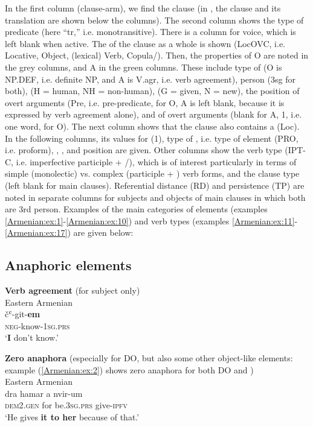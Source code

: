 \documentclass[output=paper,colorlinks,citecolor=brown,draftmode]{langscibook}
\begin{document}
In the first column (clause-arm), we find the clause (in , the clause and its translation are shown below the columns). The second column shows the type of predicate (here ``tr,'' i.e. monotransitive). There is a column for voice, which is left blank when active. The  of the clause as a whole is shown (LocOVC, i.e. Locative, Object, (lexical) Verb, Copula/). Then, the properties of O are noted in the grey columns, and A in the green columns. These include type of  (O is NP.DEF, i.e. definite NP, and A is V.agr, i.e. verb agreement), person (3sg for both),  (H = human, NH = non-human),  (G = given, N = new), the position of overt arguments (Pre, i.e. pre-predicate, for O, A is left blank, because it is expressed by verb agreement alone), and  of overt arguments (blank for A, 1, i.e. one word, for O). The next column shows that the clause also contains a  (Loc). In the following columns, its values for  (1), type of , i.e. type of  element (PRO, i.e. proform), , , and position are given. Other columns show the verb type (IPT-C, i.e. imperfective participle + /), which is of interest particularly in terms of simple (monolectic) vs. complex (participle + ) verb forms, and the clause type (left blank for main clauses). Referential distance (RD) and  persistence (TP) are noted in separate columns for subjects and objects of main clauses in which both are 3rd person. Examples of the main categories of  elements (examples \ref{Armenian:ex:1}-\ref{Armenian:ex:10}) and verb types (examples \ref{Armenian:ex:11}-\ref{Armenian:ex:17}) are given below:


\subsection{Anaphoric elements}

\ea\label{Armenian:ex:1}
\textbf{Verb agreement} (for subject only) \\
Eastern Armenian  \\
\gll čʿ-git-\textbf{em} \\
\textsc{neg-}know\textsc{-1sg.prs} \\
\glt `\textbf{I} don't know.'
\z

\ea\label{Armenian:ex:2}
\textbf{Zero anaphora} (especially for DO, but also some other object-like elements: example (\ref{Armenian:ex:2}) shows zero anaphora for both DO and )\\
Eastern Armenian  \\
\gll dra hamar a nvir-um \\
\textsc{dem2.gen} for be\textsc{.3sg.prs} give\textsc{-ipfv} \\
\glt `He gives \textbf{it to her} because of that.'
\z
 
\end{document}
